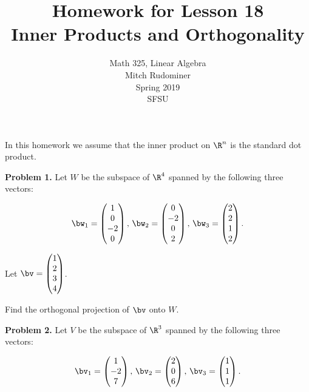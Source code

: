 \documentclass[oneside,12pt]{amsart}
\begin{document}
\title{Homework for Lesson 18 \\ Inner Products and Orthogonality}
\author{Math 325, Linear Algebra \\ Mitch Rudominer \\Spring 2019 \\ SFSU }
\date{}

\maketitle

\bigskip

In this homework we assume that the inner product on $\R^n$ is the standard
dot product.

\bigskip

\textbf{Problem 1.} Let $W$ be the subspace of $\R^4$ spanned by the
following three vectors:

$$
\bw_1=
\begin{pmatrix}
1  \\
0  \\
-2 \\
0
\end{pmatrix}
\text{, }
\bw_2=
\begin{pmatrix}
0 \\
-2\\
0 \\
2
\end{pmatrix}
\text{, }
\bw_3=
\begin{pmatrix}
2 \\
2 \\
1 \\
2
\end{pmatrix}
.$$

Let $\bv=
\begin{pmatrix}
1 \\
2 \\
3 \\
4
\end{pmatrix}
$.

\bigskip

Find the orthogonal projection of $\bv$ onto $W$.

\bigskip
\bigskip
\bigskip
\bigskip

\textbf{Problem 2.} Let $V$ be the subspace of $\R^3$ spanned by the following
three vectors:

$$
\bv_1=
\begin{pmatrix}
1  \\
-2  \\
7   \\
\end{pmatrix}
\text{, }
\bv_2=
\begin{pmatrix}
2 \\
0\\
6 \\
\end{pmatrix}
\text{, }
\bv_3=
\begin{pmatrix}
1 \\
1 \\
1 \\
\end{pmatrix}
.$$
\end{document}
